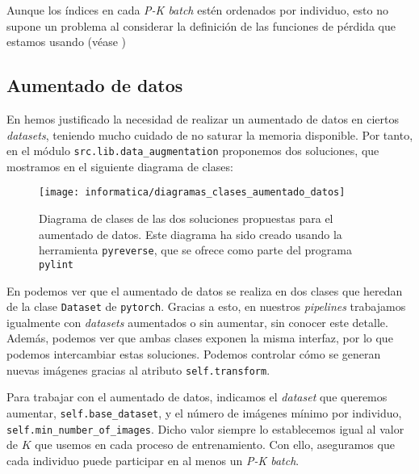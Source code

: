 \begin{observacion}

    Aunque los índices en cada \textit{P-K batch} estén ordenados por individuo, esto no supone un problema al considerar la definición de las funciones de pérdida que estamos usando (véase )

\end{observacion}

\subsection{Aumentado de datos} \label{isec:aumentado_datos}

En  hemos justificado la necesidad de realizar un aumentado de datos en ciertos \textit{datasets}, teniendo mucho cuidado de no saturar la memoria disponible. Por tanto, en el módulo \lstinline{src.lib.data_augmentation} proponemos dos soluciones, que mostramos en el siguiente diagrama de clases:

\begin{figure}[H]
    \centering
    \texttt{[image: informatica/diagramas\_clases\_aumentado\_datos]}
    \caption{Diagrama de clases de las dos soluciones propuestas para el aumentado de datos. Este diagrama ha sido creado usando la herramienta \lstinline{pyreverse}, que se ofrece como parte del programa \lstinline{pylint}}
    \label{img:diagrama_clases_aumentado_datos}
\end{figure}

En  podemos ver que el aumentado de datos se realiza en dos clases que heredan de la clase \lstinline{Dataset} de \lstinline{pytorch}. Gracias a esto, en nuestros \textit{pipelines} trabajamos igualmente con \textit{datasets} aumentados o sin aumentar, sin conocer este detalle. Además, podemos ver que ambas clases exponen la misma interfaz, por lo que podemos intercambiar estas soluciones. Podemos controlar cómo se generan nuevas imágenes gracias al atributo \lstinline{self.transform}.

Para trabajar con el aumentado de datos, indicamos el \textit{dataset} que queremos aumentar, \lstinline{self.base_dataset}, y el número de imágenes mínimo por individuo, \lstinline{self.min_number_of_images}. Dicho valor siempre lo establecemos igual al valor de $K$ que usemos en cada proceso de entrenamiento. Con ello, aseguramos que cada individuo puede participar en al menos un \textit{P-K batch}.

